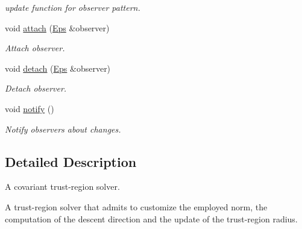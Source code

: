 \begin{DoxyCompactItemize}
\begin{DoxyCompactList}\small\item\em update function for observer pattern. \end{DoxyCompactList}\item 
\hypertarget{classSpacy_1_1Mixin_1_1MixinConnection_abb5520ee6b22dd993d78f142939a1ed4}{void \hyperlink{classSpacy_1_1Mixin_1_1MixinConnection_abb5520ee6b22dd993d78f142939a1ed4}{attach} (\hyperlink{classSpacy_1_1Mixin_1_1Eps_af616ae8e55a645cefd4d2d4504d6705a}{Eps} \&observer)}\label{classSpacy_1_1Mixin_1_1MixinConnection_abb5520ee6b22dd993d78f142939a1ed4}

\begin{DoxyCompactList}\small\item\em Attach observer. \end{DoxyCompactList}\item 
\hypertarget{classSpacy_1_1Mixin_1_1MixinConnection_adda739590c487679c26f60e50aedb73f}{void \hyperlink{classSpacy_1_1Mixin_1_1MixinConnection_adda739590c487679c26f60e50aedb73f}{detach} (\hyperlink{classSpacy_1_1Mixin_1_1Eps_af616ae8e55a645cefd4d2d4504d6705a}{Eps} \&observer)}\label{classSpacy_1_1Mixin_1_1MixinConnection_adda739590c487679c26f60e50aedb73f}

\begin{DoxyCompactList}\small\item\em Detach observer. \end{DoxyCompactList}\item 
\hypertarget{classSpacy_1_1Mixin_1_1MixinConnection_a1ddeaa78a3bb4a38c2cca36d1f99fe36}{void \hyperlink{classSpacy_1_1Mixin_1_1MixinConnection_a1ddeaa78a3bb4a38c2cca36d1f99fe36}{notify} ()}\label{classSpacy_1_1Mixin_1_1MixinConnection_a1ddeaa78a3bb4a38c2cca36d1f99fe36}

\begin{DoxyCompactList}\small\item\em Notify observers about changes. \end{DoxyCompactList}\end{DoxyCompactItemize}


\subsection{Detailed Description}
A covariant trust-\/region solver. 

A trust-\/region solver that admits to customize the employed norm, the computation of the descent direction and the update of the trust-\/region radius. 


